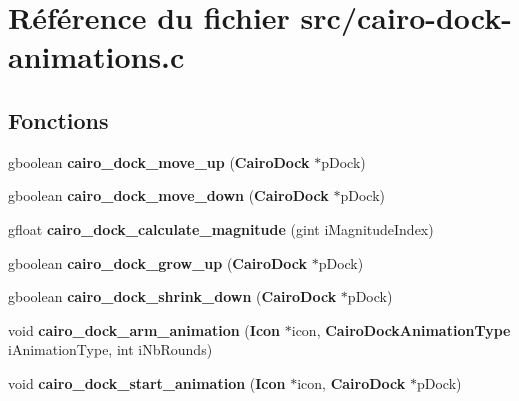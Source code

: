 \section{R\'{e}f\'{e}rence du fichier src/cairo-dock-animations.c}
\label{cairo-dock-animations_8c}
\subsection*{Fonctions}
\begin{CompactItemize}
\item 
gboolean {\bf cairo\_\-dock\_\-move\_\-up} ({\bf Cairo\-Dock} $\ast$p\-Dock)
\item 
gboolean {\bf cairo\_\-dock\_\-move\_\-down} ({\bf Cairo\-Dock} $\ast$p\-Dock)
\item 
gfloat {\bf cairo\_\-dock\_\-calculate\_\-magnitude} (gint i\-Magnitude\-Index)
\item 
gboolean {\bf cairo\_\-dock\_\-grow\_\-up} ({\bf Cairo\-Dock} $\ast$p\-Dock)
\item 
gboolean {\bf cairo\_\-dock\_\-shrink\_\-down} ({\bf Cairo\-Dock} $\ast$p\-Dock)
\item 
void {\bf cairo\_\-dock\_\-arm\_\-animation} ({\bf Icon} $\ast$icon, {\bf Cairo\-Dock\-Animation\-Type} i\-Animation\-Type, int i\-Nb\-Rounds)
\item 
void {\bf cairo\_\-dock\_\-start\_\-animation} ({\bf Icon} $\ast$icon, {\bf Cairo\-Dock} $\ast$p\-Dock)
\end{CompactItemize}

